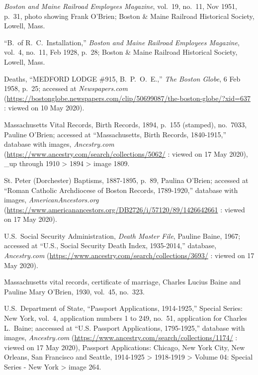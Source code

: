 \begin{thebibliography}{999}
\textit{Boston and Maine Railroad Employees Magazine}, vol.\ 19, no.\ 11, Nov 1951, p.\ 31, photo showing Frank O'Brien; Boston \& Maine Railroad Historical Society, Lowell, Mass.

``B.\ of R.\ C.\ Installation,'' \textit{Boston and Maine Railroad Employees Magazine}, vol.\ 4, no.\ 11, Feb 1928, p.\ 28; Boston \& Maine Railroad Historical Society, Lowell, Mass.

Deaths, ``MEDFORD LODGE \#915, B.\ P.\ O.\ E.,'' \textit{The Boston Globe}, 6 Feb 1958, p.\ 25; accessed at \textit{Newspapers.com} (\url{https://bostonglobe.newspapers.com/clip/50699087/the-boston-globe/?xid=637} : viewed on 10 May 2020).


Massachusetts Vital Records, Birth Records, 1894, p.\ 155 (stamped), no.\ 7033, Pauline O'Brien; accessed at ``Massachusetts, Birth Records, 1840-1915,'' database with images, \textit{Ancestry.com} (\url{https://www.ancestry.com/search/collections/5062/} : viewed on 17 May 2020), \_up through 1910 > 1894 > image 1809.

St. Peter (Dorchester) Baptisms, 1887-1895, p.\ 89, Paulina O'Brien; accessed at ``Roman Catholic Archdiocese of Boston Records, 1789-1920,'' database with images, \textit{AmericanAncestors.org} (\url{https://www.americanancestors.org/DB2726/i/57120/89/1426642661} : viewed on 17 May 2020).

U.S.\ Social Security Administration, \textit{Death Master File}, Pauline Baine, 1967; accessed at ``U.S., Social Security Death Index, 1935-2014,'' database, \textit{Ancestry.com} (\url{https://www.ancestry.com/search/collections/3693/} : viewed on 17 May 2020).


Massachusetts vital records, certificate of marriage, Charles Lucius Baine and Pauline Mary O'Brien, 1930, vol.\ 45, no.\ 323.

U.S.\ Department of State, ``Passport Applications, 1914-1925,'' Special Series: New York, vol.\ 4, application numbers 1 to 249, no.\ 51, application for Charles L.\ Baine; aaccessed at ``U.S. Passport Applications, 1795-1925,'' database with images, \textit{Ancestry.com} (\url{https://www.ancestry.com/search/collections/1174/} : viewed on 17 May 2020), Passport Applications: Chicago, New York City, New Orleans, San Francisco and Seattle, 1914-1925 > 1918-1919 > Volume 04: Special Series - New York > image 264.


\end{thebibliography}
